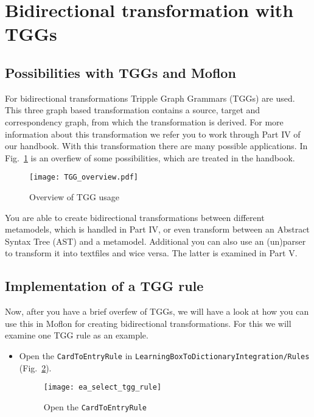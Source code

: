\section{Bidirectional transformation with TGGs}

\subsection{Possibilities with TGGs and Moflon}
\label{TGG_overview_chapter}
For bidirectional transformations Tripple Graph Grammars (TGGs) are used. This three graph based transformation contains a source, target and correspondency graph, from which the transformation is derived. For more information about this transformation we refer you to work through Part IV of our handbook.
\newline
With this transformation there are many possible applications. In Fig.~\ref{Tgg_overview} is an overfiew of some possibilities, which are treated in the handbook.

\begin{figure}[htbp]
	\centering
  \texttt{[image: TGG\_overview.pdf]}
	\caption{Overview of TGG usage} 
	\label{Tgg_overview} 
\end{figure}


You are able to create bidirectional transformations between different metamodels, which is handled in Part IV, or even transform between an Abstract Syntax Tree (AST) and a metamodel. Additional you can also use an (un)parser to transform it into textfiles and wice versa. The latter is examined in Part V.


\subsection{Implementation of a TGG rule}
Now, after you have a brief overfew of TGGs, we will have a look at how you can use this in Moflon for creating bidirectional transformations. For this we will examine one TGG rule as an example.

\begin{itemize}

\item Open the \texttt{CardToEntryRule} in \texttt{Learning\-Box\-To\-Dictionary\-Integra\-tion/\-Rules} (Fig.~\ref{ea:openTGG_rule}).

\begin{figure}[htbp]
	\centering
  \texttt{[image: ea\_select\_tgg\_rule]}
	\caption{Open the \texttt{CardToEntryRule}} 
	\label{ea:openTGG_rule} 
\end{figure}

\end{itemize}

